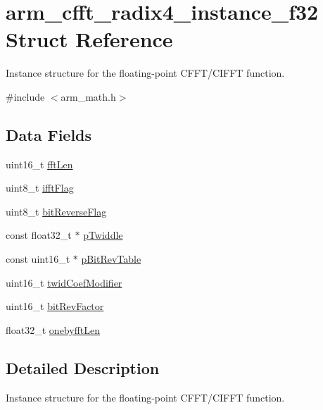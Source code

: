 \hypertarget{structarm__cfft__radix4__instance__f32}{}\section{arm\+\_\+cfft\+\_\+radix4\+\_\+instance\+\_\+f32 Struct Reference}
\label{structarm__cfft__radix4__instance__f32}


Instance structure for the floating-\/point C\+F\+F\+T/\+C\+I\+F\+FT function.  




{\ttfamily \#include $<$arm\+\_\+math.\+h$>$}

\subsection*{Data Fields}
\begin{DoxyCompactItemize}
\item 
uint16\+\_\+t \mbox{\hyperlink{structarm__cfft__radix4__instance__f32_ab8db3bbe7c61e6bb8ca2a55e3446e11a}{fft\+Len}}
\item 
uint8\+\_\+t \mbox{\hyperlink{structarm__cfft__radix4__instance__f32_ad6ca6e223f986ebfd94c5ee1e410aa73}{ifft\+Flag}}
\item 
uint8\+\_\+t \mbox{\hyperlink{structarm__cfft__radix4__instance__f32_a09a221a818c6d0e064557a99e2fe9a8b}{bit\+Reverse\+Flag}}
\item 
const float32\+\_\+t $\ast$ \mbox{\hyperlink{structarm__cfft__radix4__instance__f32_a8292d9775f5c5472f59915649fe3b378}{p\+Twiddle}}
\item 
const uint16\+\_\+t $\ast$ \mbox{\hyperlink{structarm__cfft__radix4__instance__f32_a3b229432d381b0a511a9cdbe3aa74e78}{p\+Bit\+Rev\+Table}}
\item 
uint16\+\_\+t \mbox{\hyperlink{structarm__cfft__radix4__instance__f32_afe772e5b5001c9d8e85032115a8df5bf}{twid\+Coef\+Modifier}}
\item 
uint16\+\_\+t \mbox{\hyperlink{structarm__cfft__radix4__instance__f32_a33386d95319dc3ee7097b3a8e52e01ec}{bit\+Rev\+Factor}}
\item 
float32\+\_\+t \mbox{\hyperlink{structarm__cfft__radix4__instance__f32_acf295a7b97b7d48a9cae4d1ab5ed00f6}{onebyfft\+Len}}
\end{DoxyCompactItemize}


\subsection{Detailed Description}
Instance structure for the floating-\/point C\+F\+F\+T/\+C\+I\+F\+FT function. 

